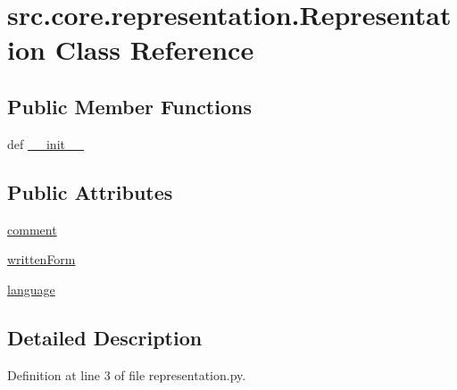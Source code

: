 \hypertarget{classsrc_1_1core_1_1representation_1_1_representation}{\section{src.\+core.\+representation.\+Representation Class Reference}
\label{classsrc_1_1core_1_1representation_1_1_representation}
}
\subsection*{Public Member Functions}
\begin{DoxyCompactItemize}
\item 
def \hyperlink{classsrc_1_1core_1_1representation_1_1_representation_ac2a2d057963db31cf13f93cee36c8c64}{\+\_\+\+\_\+init\+\_\+\+\_\+}
\end{DoxyCompactItemize}
\subsection*{Public Attributes}
\begin{DoxyCompactItemize}
\item 
\hyperlink{classsrc_1_1core_1_1representation_1_1_representation_a72e49f86ec58c698f2a75c2046d25d62}{comment}
\item 
\hyperlink{classsrc_1_1core_1_1representation_1_1_representation_ad4ec4b05057384573370ea9513f16a8f}{written\+Form}
\item 
\hyperlink{classsrc_1_1core_1_1representation_1_1_representation_a01443961d9cdedf9d6353d9a140644d6}{language}
\end{DoxyCompactItemize}


\subsection{Detailed Description}


Definition at line 3 of file representation.\+py.



